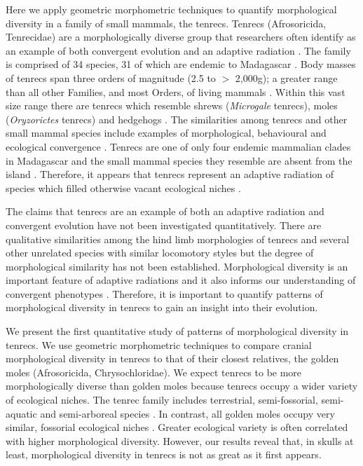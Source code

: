 \documentclass[12pt,a4paper]{article}
\begin{document}
	Here we apply geometric morphometric techniques to quantify morphological diversity in a family of small mammals, the tenrecs. Tenrecs (Afrosoricida, Tenrecidae) are a morphologically diverse group that researchers often identify as an example of both convergent evolution and an adaptive radiation \citep{Soarimalala2011, Eisenberg1969}. The family is comprised of 34 species, 31 of which are endemic to Madagascar \citep{Olson2013}. Body masses of tenrecs span three orders of magnitude (2.5 to $>$ 2,000g); a greater range than all other Families, and most Orders, of living mammals \citep{Olson2003}. Within this vast size range there are tenrecs which resemble shrews (\textit{Microgale} tenrecs), moles (\textit{Oryzorictes} tenrecs) and hedgehogs \citep[\textit{Echinops} and \textit{Setifer} tenrecs,][]{Eisenberg1969}. The similarities among tenrecs and other small mammal species include examples of morphological, behavioural and ecological convergence \citep{Soarimalala2011}. Tenrecs are one of only four endemic mammalian clades in Madagascar and the small mammal species they resemble are absent from the island \citep{Garbutt1999}. Therefore, it appears that tenrecs represent an adaptive radiation of species which filled otherwise vacant ecological niches \citep{Soarimalala2011}.
	
	The claims that tenrecs are an example of both an adaptive radiation and convergent evolution have not been investigated quantitatively. There are qualitative similarities among the hind limb morphologies of tenrecs and several other unrelated species with similar locomotory styles \citep{Salton2009} but the degree of morphological similarity has not been established. Morphological diversity is an important feature of adaptive radiations \citep{Losos2010a} and it also informs our understanding of convergent phenotypes \citep{Muschick2012}. Therefore, it is important to quantify patterns of morphological diversity in tenrecs to gain an insight into their evolution. 
	
	We present the first quantitative study of patterns of morphological diversity in tenrecs. We use geometric morphometric techniques \citep{Rohlf1993} to compare cranial morphological diversity in tenrecs to that of their closest relatives, the golden moles (Afrosoricida, Chrysochloridae). 
	We expect tenrecs to be more morphologically diverse than golden moles because tenrecs occupy a wider variety of ecological niches. The tenrec family includes terrestrial, semi-fossorial, semi-aquatic and semi-arboreal species \citep{Soarimalala2011}. In contrast, all golden moles occupy very similar, fossorial ecological niches \citep{Bronner1995}. Greater ecological variety is often \citep[though not always:][]{McGee2013, Losos2010a} correlated with higher morphological diversity. However, our results reveal that, in skulls at least, morphological diversity in tenrecs is not as great as it first appears.
	
\end{document}
